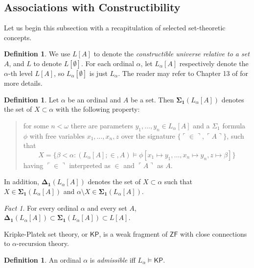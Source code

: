 \documentclass[12pt, twoside]{memoir}
\numberwithin{equation}{section}
\theoremstyle{definition}
\newtheorem{defi}[thm]{Definition}
\theoremstyle{remark}
\newtheorem{fact}[thm]{Fact}
\theoremstyle{definition}
\theoremstyle{definition}
\theoremstyle{definition}
\theoremstyle{remark}
\begin{document}
\subsection{Associations with Constructibility}

Let us begin this subsection with a recapitulation of selected set-theoretic concepts.

\begin{defi}
We use $L[A]$ to denote the \emph{constructible universe relative to a set} $A$, and $L$ to denote $L[\emptyset]$. For each ordinal $\alpha$, let $L_{\alpha}[A]$ respectively denote the $\alpha$-th level $L[A]$, so $L_{\alpha}[\emptyset]$ is just $L_{\alpha}$. The reader may refer to Chapter 13 of \cite{jech} for more details.
\end{defi}

\begin{defi}
Let $\alpha$ be an ordinal and $A$ be a set. Then $\mathbf{\Sigma_1}(L_{\alpha}[A])$ denotes the set of $X \subset \alpha$ with the following property: 
\begin{quote}
    for some $n < \omega$ there are parameters $y_1, \dots, y_n \in L_{\alpha}[A]$ and a $\Sigma_1$ formula $\phi$ with free variables $x_1, \dots, x_{n}, z$ over the signature $\{\ulcorner \in \urcorner, \ulcorner A \urcorner\}$, such that 
    \begin{equation*}
        X = \{\beta < \alpha : (L_{\alpha}[A]; \in, A) \models \phi[x_1 \mapsto y_1, \dots, x_n \mapsto y_n, z \mapsto \beta]\}
    \end{equation*}
    having $\ulcorner \in \urcorner$ interpreted as $\in$ and $\ulcorner A \urcorner$ as $A$.
\end{quote}
In addition, $\mathbf{\Delta_1}(L_{\alpha}[A])$ denotes the set of $X \subset \alpha$ such that $X \in \mathbf{\Sigma_1}(L_{\alpha}[A])$ and $\alpha \setminus X \in \mathbf{\Sigma_1}(L_{\alpha}[A])$.
\end{defi}

\begin{fact}
For every ordinal $\alpha$ and every set $A$, $\mathbf{\Delta_1}(L_{\alpha}[A]) \subset \mathbf{\Sigma_1}(L_{\alpha}[A]) \subset L[A]$.
\end{fact}

Kripke-Platek set theory, or $\mathsf{KP}$, is a weak fragment of $\mathsf{ZF}$ with close connections to $\alpha$-recursion theory.

\begin{defi}
An ordinal $\alpha$ is \emph{admissible} iff $L_{\alpha} \models \mathsf{KP}$.
\end{defi}
\end{document}
